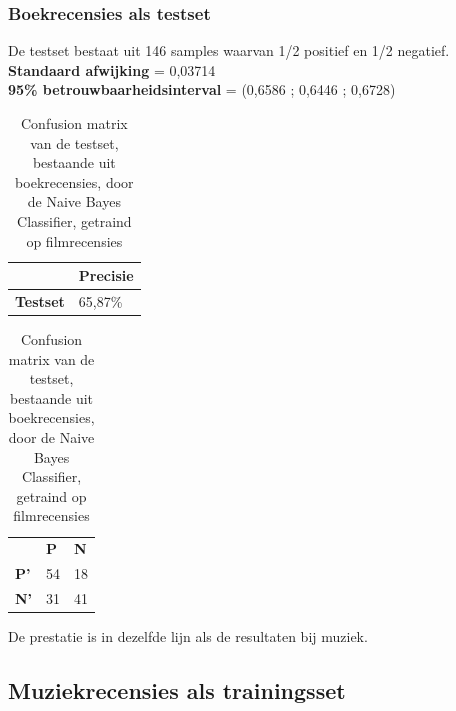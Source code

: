 \subsubsection{Boekrecensies als testset}\label{Boekrecensies testset-movie}

De testset bestaat uit 146 samples waarvan 1/2 positief en 1/2 negatief.\\

\textbf{Standaard afwijking} = 0,03714\\
\textbf{95\% betrouwbaarheidsinterval} = (0,6586 ; 0,6446 ; 0,6728)\\
 
\begin{table}[h]
\centering
\setlength\tabcolsep{4pt}
\begin{minipage}[t]{0.48\textwidth}
\centering
\begin{tabular}{l|l|}
\cline{2-2}
                                            & \textbf{Precisie} \\ \hline
\multicolumn{1}{|l|}{\textbf{Testset}}      & 65,87\%           \\ \hline
\end{tabular}
\caption{Classificatieprecisie Naive Bayes Classifier, getraind op filmrecensies, getest op boekrecensies}
\end{minipage}%
\hfill
\begin{minipage}[t]{0.48\textwidth}
\centering
\begin{tabular}{lll}
                                 & \textbf{P}               & \textbf{N}               \\ \cline{2-3} 
\multicolumn{1}{l|}{\textbf{P'}} & \multicolumn{1}{l|}{54} & \multicolumn{1}{l|}{18} \\ \cline{2-3} 
\multicolumn{1}{l|}{\textbf{N'}} & \multicolumn{1}{l|}{31} & \multicolumn{1}{l|}{41} \\ \cline{2-3} 
\end{tabular}
\caption{Confusion matrix van de testset, bestaande uit boekrecensies, door de  Naive Bayes Classifier, getraind op filmrecensies} 
\end{minipage}
\end{table}

De prestatie is in dezelfde lijn als de resultaten bij muziek. 

\subsection{Muziekrecensies als trainingsset}\label{Muziekrecensies als trainingsset}

